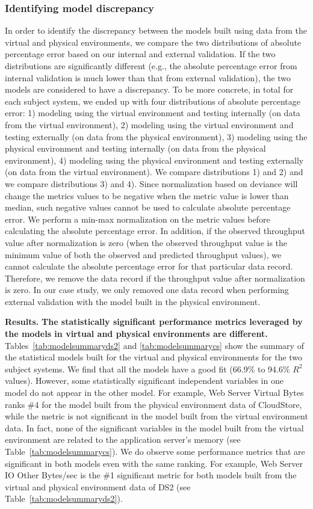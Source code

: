 \documentclass[smallextended]{svjour3}       %
\begin{document}
\subsubsection{Identifying model discrepancy}
In order to identify the discrepancy between the models built using data from the virtual and physical environments, we compare the two distributions of absolute percentage error based on our internal and external validation. If the two distributions are significantly different (e.g., the absolute percentage error from internal validation is much lower than that from external validation), the two models are considered to have a discrepancy. To be more concrete, in total for each subject system, we ended up with four distributions of absolute percentage error: 1) modeling using the virtual environment and testing internally (on data from the virtual environment), 2) modeling using the virtual environment and testing externally (on data from the physical environment), 3) modeling using the physical environment and testing internally (on data from the physical environment), 4) modeling using the physical environment and testing externally (on data from the virtual environment). We compare distributions 1) and 2) and we compare distributions 3) and 4). Since normalization based on deviance will change the metrics values to be negative when the metric value is lower than median, such negative values cannot be used to calculate absolute percentage error. We perform a min-max normalization on the metric values before calculating the absolute percentage error. In addition, if the observed throughput value after normalization is zero (when the observed throughput value is the minimum value of both the observed and predicted throughput values), we cannot calculate the absolute percentage error for that particular data record. Therefore, we remove the data record if the throughput value after normalization is zero. In our case study, we only removed one data record when performing external validation with the model built in the physical environment. 


\noindent \textbf{Results.}
\noindent \textbf{The statistically significant performance metrics leveraged by the models in virtual and physical environments are different.} Tables~\ref{tab:modelsummaryds2} and \ref{tab:modelsummarycs} show the summary of the statistical models built for the virtual and physical environments for the two subject systems. We find that all the models have a good fit (66.9\% to 94.6\% $R^2$ values). However, some statistically significant independent variables in one model do not appear in the other model. For example, Web Server Virtual Bytes ranks \#4 for the model built from the physical environment data of CloudStore, while the metric is not significant in the model built from the virtual environment data. In fact, none of the significant variables in the model built from the virtual environment are related to the application server's memory (see Table~\ref{tab:modelsummarycs}). We do observe some performance metrics that are significant in both models even with the same ranking. For example, Web Server IO Other Bytes/sec is the \#1 significant metric for both models built from the virtual and physical environment data of DS2 (see Table~\ref{tab:modelsummaryds2}). 
\end{document}
